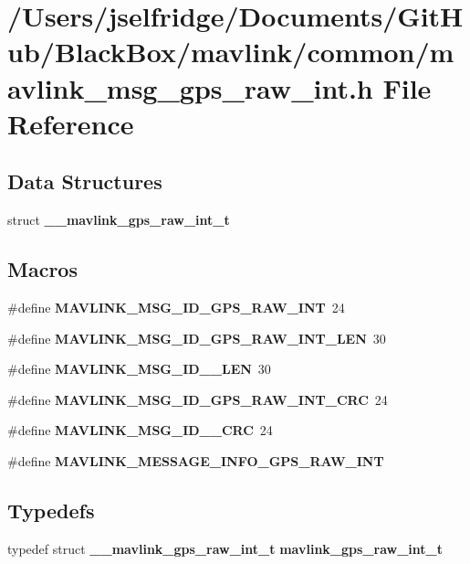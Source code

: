 \section{/\+Users/jselfridge/\+Documents/\+Git\+Hub/\+Black\+Box/mavlink/common/mavlink\+\_\+msg\+\_\+gps\+\_\+raw\+\_\+int.h File Reference}
\label{mavlink__msg__gps__raw__int_8h}
\subsection*{Data Structures}
\begin{DoxyCompactItemize}
\item 
struct \textbf{ \+\_\+\+\_\+mavlink\+\_\+gps\+\_\+raw\+\_\+int\+\_\+t}
\end{DoxyCompactItemize}
\subsection*{Macros}
\begin{DoxyCompactItemize}
\item 
\#define \textbf{ M\+A\+V\+L\+I\+N\+K\+\_\+\+M\+S\+G\+\_\+\+I\+D\+\_\+\+G\+P\+S\+\_\+\+R\+A\+W\+\_\+\+I\+NT}~24
\item 
\#define \textbf{ M\+A\+V\+L\+I\+N\+K\+\_\+\+M\+S\+G\+\_\+\+I\+D\+\_\+\+G\+P\+S\+\_\+\+R\+A\+W\+\_\+\+I\+N\+T\+\_\+\+L\+EN}~30
\item 
\#define \textbf{ M\+A\+V\+L\+I\+N\+K\+\_\+\+M\+S\+G\+\_\+\+I\+D\+\_\+\_\+\+L\+EN}~30
\item 
\#define \textbf{ M\+A\+V\+L\+I\+N\+K\+\_\+\+M\+S\+G\+\_\+\+I\+D\+\_\+\+G\+P\+S\+\_\+\+R\+A\+W\+\_\+\+I\+N\+T\+\_\+\+C\+RC}~24
\item 
\#define \textbf{ M\+A\+V\+L\+I\+N\+K\+\_\+\+M\+S\+G\+\_\+\+I\+D\+\_\+\_\+\+C\+RC}~24
\item 
\#define \textbf{ M\+A\+V\+L\+I\+N\+K\+\_\+\+M\+E\+S\+S\+A\+G\+E\+\_\+\+I\+N\+F\+O\+\_\+\+G\+P\+S\+\_\+\+R\+A\+W\+\_\+\+I\+NT}
\end{DoxyCompactItemize}
\subsection*{Typedefs}
\begin{DoxyCompactItemize}
\item 
typedef struct \textbf{ \+\_\+\+\_\+mavlink\+\_\+gps\+\_\+raw\+\_\+int\+\_\+t} \textbf{ mavlink\+\_\+gps\+\_\+raw\+\_\+int\+\_\+t}
\end{DoxyCompactItemize}



